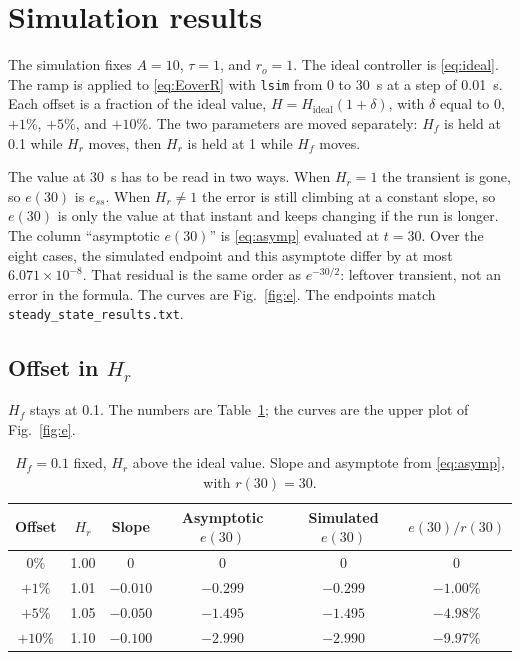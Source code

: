 \documentclass[12pt,a4paper]{article}
\begin{document}
\section{Simulation results}

The simulation fixes \(A=10\), \(\tau=1\), and \(r_o=1\). The ideal controller is \eqref{eq:ideal}.
The ramp is applied to \eqref{eq:EoverR} with \texttt{lsim} from 0 to 30~s at a step of 0.01~s.
Each offset is a fraction of the ideal value, \(H=H_{\mathrm{ideal}}(1+\delta)\), with \(\delta\) equal to \(0\), \(+1\%\), \(+5\%\), and \(+10\%\).
The two parameters are moved separately: \(H_f\) is held at 0.1 while \(H_r\) moves, then \(H_r\) is held at 1 while \(H_f\) moves.

The value at 30~s has to be read in two ways. When \(H_r=1\) the transient is gone, so \(e(30)\) is \(e_{ss}\).
When \(H_r\neq 1\) the error is still climbing at a constant slope, so \(e(30)\) is only the value at that instant and keeps changing if the run is longer.
The column ``asymptotic \(e(30)\)'' is \eqref{eq:asymp} evaluated at \(t=30\).
Over the eight cases, the simulated endpoint and this asymptote differ by at most \(6.071\times 10^{-8}\).
That residual is the same order as \(e^{-30/2}\): leftover transient, not an error in the formula.
The curves are Fig.~\ref{fig:e}. The endpoints match \texttt{steady\_state\_results.txt}.

\subsection{Offset in \texorpdfstring{\(H_r\)}{Hr}}

\(H_f\) stays at 0.1. The numbers are Table~\ref{tab:Hr}; the curves are the upper plot of Fig.~\ref{fig:e}.

\begin{table}[H]
  \centering
  \caption{\(H_f=0.1\) fixed, \(H_r\) above the ideal value. Slope and asymptote from \eqref{eq:asymp}, with \(r(30)=30\).}
  \label{tab:Hr}
  \begin{tabular}{cccccc}
    \toprule
    Offset & \(H_r\) & Slope & Asymptotic \(e(30)\) & Simulated \(e(30)\) & \(e(30)/r(30)\) \\
    \midrule
    \(0\%\)   & 1.00 & \(0\)      & \(0\)      & \(0\)      & \(0\) \\
    \(+1\%\)  & 1.01 & \(-0.010\) & \(-0.299\) & \(-0.299\) & \(-1.00\%\) \\
    \(+5\%\)  & 1.05 & \(-0.050\) & \(-1.495\) & \(-1.495\) & \(-4.98\%\) \\
    \(+10\%\) & 1.10 & \(-0.100\) & \(-2.990\) & \(-2.990\) & \(-9.97\%\) \\
    \bottomrule
  \end{tabular}
\end{table}
\end{document}
